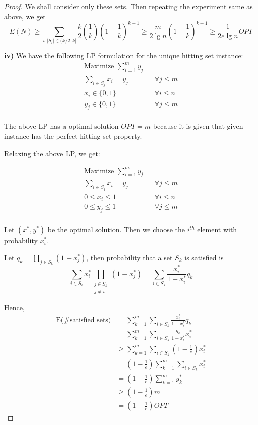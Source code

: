 \documentclass[12pt]{article}
\begin{document}
\begin{proof}
We shall consider only these sets. Then repeating the experiment same as above, we get
$$E(N) \geq \sum_{i: |S_i| \in (k/2,k]} \frac{k}{2} \left(\frac{1}{k}\right)\left(1-\frac{1}{k}\right)^{k-1} \geq  \frac{m}{2\lg n} \left(1-\frac{1}{k}\right)^{k-1} \geq \frac{1}{2e\lg n} OPT$$

\textbf{iv)} We have the following LP formulation for the unique hitting set instance:
\begin{align*}
    \text{Maximize } \sum_{i=1}^m y_j \\
    \sum_{i \in S_j} x_i = y_j && \forall j \leq m \\
    x_i \in \{0,1\} && \forall i \leq n \\
    y_j \in \{0,1\} && \forall j \leq m \\
\end{align*}

The above LP has a optimal solution $OPT = m$ because it is given that given instance has the perfect hitting set property.

Relaxing the above LP, we get:

\begin{align*}
    \text{Maximize } \sum_{i=1}^m y_j \\
    \sum_{i \in S_j} x_i = y_j && \forall j \leq m \\
    0 \leq x_i \leq 1 && \forall i \leq n \\
    0 \leq y_j \leq 1 && \forall j \leq m \\
\end{align*}

Let $(x^*, y^*)$ be the optimal solution. Then we choose the $i^{th}$ element with probability $x_i^*$.

Let $q_k = \prod_{j \in S_k} (1- x_j^*)$, then probability that a set $S_k$ is satisfied is 
$$\sum_{i \in S_k} x_i^* \prod_{\substack{j \in S_k \\ j \neq i}} (1-x_j^*) = \sum_{i \in S_k} \frac{x_i^*}{1 - x_i^*} q_k$$

Hence,
\begin{align*}
    \text{E(\# satisfied sets)} &= \sum_{k=1}^m \sum_{i \in S_k} \frac{x_i^*}{1 - x_i^*} q_k \\
    &= \sum_{k=1}^m \sum_{i \in S_k} \frac{q_k}{1 - x_i^*} x_i^* \\
    &\geq \sum_{k=1}^m \sum_{i \in S_k} \left(1-\frac{1}{e}\right) x_i^* \\
    &= \left(1-\frac{1}{e}\right) \sum_{k=1}^m \sum_{i \in S_k} x_i^* \\
    &= \left(1-\frac{1}{e}\right) \sum_{k=1}^m y_k^* \\
    &\geq \left(1-\frac{1}{e} \right) m \\
    &= \left(1-\frac{1}{e} \right) OPT
\end{align*}



\end{proof}
\end{document}
